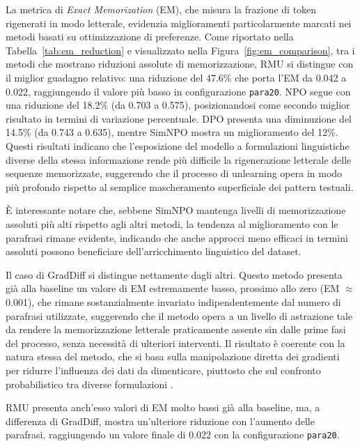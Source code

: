 La metrica di \textit{Exact Memorization} (EM), che misura la frazione di token rigenerati in modo letterale, evidenzia miglioramenti particolarmente marcati nei metodi basati su ottimizzazione di preferenze. Come riportato nella Tabella~\ref{tab:em_reduction} e visualizzato nella Figura~\ref{fig:em_comparison}, tra i metodi che mostrano riduzioni assolute di memorizzazione, RMU si distingue con il miglior guadagno relativo: una riduzione del 47.6\% che porta l'EM da 0.042 a 0.022, raggiungendo il valore più basso in configurazione \texttt{para20}. NPO segue con una riduzione del 18.2\% (da 0.703 a 0.575), posizionandosi come secondo miglior risultato in termini di variazione percentuale. DPO presenta una diminuzione del 14.5\% (da 0.743 a 0.635), mentre SimNPO mostra un miglioramento del 12\%. Questi risultati indicano che l'esposizione del modello a formulazioni linguistiche diverse della stessa informazione rende più difficile la rigenerazione letterale delle sequenze memorizzate, suggerendo che il processo di unlearning opera in modo più profondo rispetto al semplice mascheramento superficiale dei pattern testuali.

È interessante notare che, sebbene SimNPO mantenga livelli di memorizzazione assoluti più alti rispetto agli altri metodi, la tendenza al miglioramento con le parafrasi rimane evidente, indicando che anche approcci meno efficaci in termini assoluti possono beneficiare dell'arricchimento linguistico del dataset.

Il caso di GradDiff si distingue nettamente dagli altri. Questo metodo presenta già alla baseline un valore di EM estremamente basso, prossimo allo zero (EM $\approx$ 0.001), che rimane sostanzialmente invariato indipendentemente dal numero di parafrasi utilizzate, suggerendo che il metodo opera a un livello di astrazione tale da rendere la memorizzazione letterale praticamente assente sin dalle prime fasi del processo, senza necessità di ulteriori interventi. Il risultato è coerente con la natura stessa del metodo, che si basa sulla manipolazione diretta dei gradienti per ridurre l'influenza dei dati da dimenticare, piuttosto che sul confronto probabilistico tra diverse formulazioni \cite{maini2024tofu}.

RMU presenta anch'esso valori di EM molto bassi già alla baseline, ma, a differenza di GradDiff, mostra un'ulteriore riduzione con l'aumento delle parafrasi, raggiungendo un valore finale di 0.022 con la configurazione \texttt{para20}.

